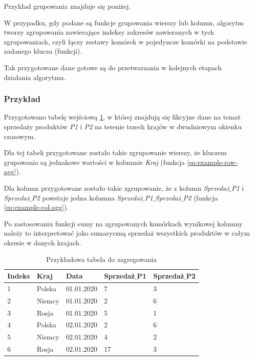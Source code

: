 \documentclass[brudnopis]{xmgr}
\begin{document}
Przykład grupowania znajduje się poniżej.
\medskip

W przypadku, gdy podane są funkcje grupowania wierszy lub kolumn, algorytm tworzy zgrupowania zawierające indeksy zakresów zawieranych w tych zgrupowaniach, czyli łączy zestawy komórek w pojedyncze komórki na podstawie zadanego klucza (funkcji).
\medskip

Tak przygotowane dane gotowe są do przetwarzania w kolejnych etapach działania algorytmu.

\subsubsection{Przykład}
\medskip

Przygotowano tabelę wejściową \ref{tab:example-input}, w której znajdują się fikcyjne dane na temat sprzedaży produktów \emph{P1} i \emph{P2} na terenie trzech krajów w dwudniowym okienku czasowym.
\medskip

Dla tej tabeli przygotowane zostało takie zgrupowanie wierszy, że kluczem grupowania są jednakowe wartości w kolumnie \emph{Kraj} (funkcja \ref{eq:example-row-agg}).
\medskip

Dla kolumn przygotowane zostało takie zgrupowanie, że z kolumn \emph{Sprzedaż$\_$P1} i \emph{Sprzedaż$\_$P2} powstaje jedna kolumna \emph{Sprzedaż$\_$P1$\_$Sprzedaż$\_$P2} (funkcja \ref{eq:example-col-agg}).
\medskip

Po zastosowaniu funkcji sumy na zgrupowanych komórkach wynikowej kolumny należy to interpretować jako sumaryczną sprzedaż wszystkich produktów w całym okresie w danych krajach.

\begin{table}[!tbh]
\begin{tabular}{|l|l|l|l|l|} \hline
Indeks & Kraj & Data & Sprzedaż$\_$P1 & Sprzedaż$\_$P2 \\ \hline
1 & Polska & 01.01.2020 & 7 & 3 \\ \hline
2 & Niemcy & 01.01.2020 & 2 & 6 \\ \hline
3 & Rosja & 01.01.2020 & 5 & 1 \\ \hline
4 & Polska & 02.01.2020 & 2 & 6 \\ \hline
5 & Niemcy & 02.01.2020 & 4 & 2 \\ \hline
6 & Rosja & 02.01.2020 & 17 & 3 \\ \hline
\end{tabular}
\caption{Przykładowa tabela do zagregowania \label{tab:example-input}}
\end{table}
\medskip
\end{document}
